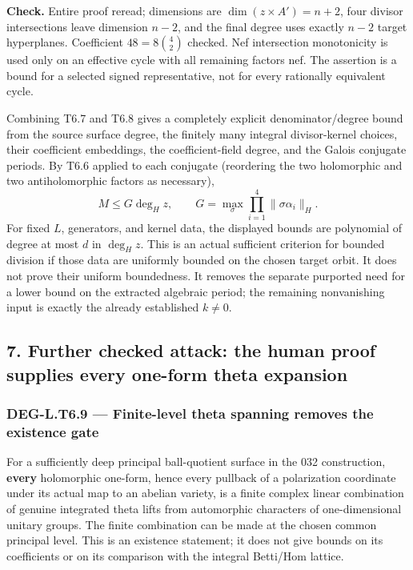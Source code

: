 \documentclass[11pt,a4paper]{article}
\theoremstyle{definition}
\begin{document}
\textbf{Check.} Entire proof reread; dimensions are \(\dim(z\times A')=n+2\), four divisor intersections leave dimension \(n-2\), and the final degree uses exactly \(n-2\) target hyperplanes. Coefficient \(48=8\binom42\) checked. Nef intersection monotonicity is used only on an effective cycle with all remaining factors nef. The assertion is a bound for a selected signed representative, not for every rationally equivalent cycle.

Combining T6.7 and T6.8 gives a completely explicit denominator/degree bound from the source surface degree, the finitely many integral divisor-kernel choices, their coefficient embeddings, the coefficient-field degree, and the Galois conjugate periods. By T6.6 applied to each conjugate (reordering the two holomorphic and two antiholomorphic factors as necessary), \[
M\le G\deg_H z,\qquad
G=\max_\sigma\prod_{i=1}^4\|\sigma\alpha_i\|_H.
\] For fixed \(L\), generators, and kernel data, the displayed bounds are polynomial of degree at most \(d\) in \(\deg_H z\). This is an actual sufficient criterion for bounded division if those data are uniformly bounded on the chosen target orbit. It does not prove their uniform boundedness. It removes the separate purported need for a lower bound on the extracted algebraic period; the remaining nonvanishing input is exactly the already established \(k\ne0\).

\subsection{7. Further checked attack: the human proof supplies every one-form theta expansion}\label{further-checked-attack-the-human-proof-supplies-every-one-form-theta-expansion}

\subsubsection{DEG-L.T6.9 --- Finite-level theta spanning removes the existence gate}\label{DEG-L.T6.9}

For a sufficiently deep principal ball-quotient surface in the 032 construction, \textbf{every} holomorphic one-form, hence every pullback of a polarization coordinate under its actual map to an abelian variety, is a finite complex linear combination of genuine integrated theta lifts from automorphic characters of one-dimensional unitary groups. The finite combination can be made at the chosen common principal level. This is an existence statement; it does not give bounds on its coefficients or on its comparison with the integral Betti/Hom lattice.
\end{document}

